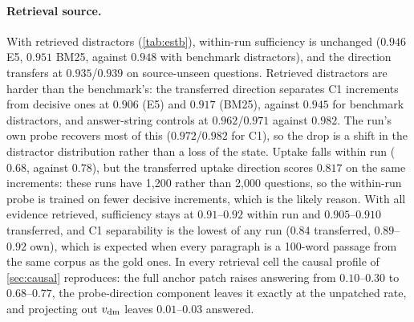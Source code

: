 \paragraph{Retrieval source.} With retrieved distractors (\cref{tab:estb}), within-run sufficiency is unchanged ($0.946$ E5, $0.951$ BM25, against $0.948$ with benchmark distractors), and the \musique{} direction transfers at $0.935$/$0.939$ on source-unseen questions. Retrieved distractors are harder than the benchmark's: the transferred direction separates C1 increments from decisive ones at $0.906$ (E5) and $0.917$ (BM25), against $0.945$ for benchmark distractors, and answer-string controls at $0.962$/$0.971$ against $0.982$. The run's own probe recovers most of this ($0.972$/$0.982$ for C1), so the drop is a shift in the distractor distribution rather than a loss of the state. Uptake falls within run ($0.68$, against $0.78$), but the transferred \musique{} uptake direction scores $0.817$ on the same increments: these runs have 1{,}200 rather than 2{,}000 questions, so the within-run probe is trained on fewer decisive increments, which is the likely reason. With all evidence retrieved, sufficiency stays at $0.91$--$0.92$ within run and $0.905$--$0.910$ transferred, and C1 separability is the lowest of any run ($0.84$ transferred, $0.89$--$0.92$ own), which is expected when every paragraph is a 100-word passage from the same corpus as the gold ones. In every retrieval cell the causal profile of \cref{sec:causal} reproduces: the full anchor patch raises answering from $0.10$--$0.30$ to $0.68$--$0.77$, the probe-direction component leaves it exactly at the unpatched rate, and projecting out $v_{\mathrm{dm}}$ leaves $0.01$--$0.03$ answered.

\begin{table}[h]
\centering\small

\caption{Quality-state separability (\musique{} variants run): AUROC separating each state's increments (negatives) from decisive increments (positives), with the run's own probe (test questions) and with the \musique{} direction (source-unseen questions). Lower values mean the state looks more like completing the evidence.}
\label{tab:estb_quality}
\end{table}

